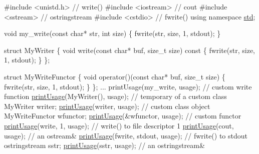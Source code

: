 \begin{DoxyCode}
\textcolor{preprocessor}{#include <unistd.h>}  \textcolor{comment}{// write()}
\textcolor{preprocessor}{#include <iostream>}  \textcolor{comment}{// cout}
\textcolor{preprocessor}{#include <sstream>}   \textcolor{comment}{// ostringstream}
\textcolor{preprocessor}{#include <cstdio>}    \textcolor{comment}{// fwrite()}
\textcolor{keyword}{using namespace }\hyperlink{namespacestd}{std};

\textcolor{keywordtype}{void} my\_write(\textcolor{keyword}{const} \textcolor{keywordtype}{char}* str, \textcolor{keywordtype}{int} size) \{
  fwrite(str, size, 1, stdout);
\}

\textcolor{keyword}{struct }MyWriter \{
  \textcolor{keywordtype}{void} write(\textcolor{keyword}{const} \textcolor{keywordtype}{char}* buf, \textcolor{keywordtype}{size\_t} size)\textcolor{keyword}{ const }\{
     fwrite(str, size, 1, stdout);
  \}
\};

\textcolor{keyword}{struct }MyWriteFunctor \{
  \textcolor{keywordtype}{void} operator()(\textcolor{keyword}{const} \textcolor{keywordtype}{char}* buf, \textcolor{keywordtype}{size\_t} size) \{
     fwrite(str, size, 1, stdout);
  \}
\};
...
printUsage(my\_write, usage);    \textcolor{comment}{// custom write function}
\hyperlink{namespaceoption_afc8bb7e040a98a0b33ff1ce9da1be0d1}{printUsage}(MyWriter(), usage);  \textcolor{comment}{// temporary of a custom class}
MyWriter writer;
\hyperlink{namespaceoption_afc8bb7e040a98a0b33ff1ce9da1be0d1}{printUsage}(writer, usage);      \textcolor{comment}{// custom class object}
MyWriteFunctor wfunctor;
\hyperlink{namespaceoption_afc8bb7e040a98a0b33ff1ce9da1be0d1}{printUsage}(&wfunctor, usage);   \textcolor{comment}{// custom functor}
\hyperlink{namespaceoption_afc8bb7e040a98a0b33ff1ce9da1be0d1}{printUsage}(write, 1, usage);    \textcolor{comment}{// write() to file descriptor 1}
\hyperlink{namespaceoption_afc8bb7e040a98a0b33ff1ce9da1be0d1}{printUsage}(cout, usage);        \textcolor{comment}{// an ostream&}
\hyperlink{namespaceoption_afc8bb7e040a98a0b33ff1ce9da1be0d1}{printUsage}(fwrite, stdout, usage);  \textcolor{comment}{// fwrite() to stdout}
ostringstream sstr;
\hyperlink{namespaceoption_afc8bb7e040a98a0b33ff1ce9da1be0d1}{printUsage}(sstr, usage);        \textcolor{comment}{// an ostringstream&}
\end{DoxyCode}


